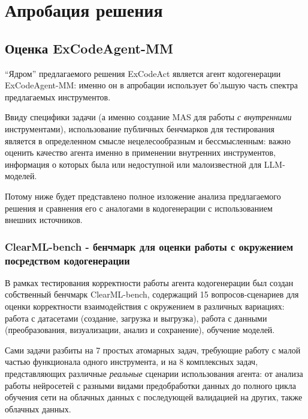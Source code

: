 \chapter{Апробация решения} \label{ch4}

\section{Оценка ExCodeAgent-MM} \label{ch4:sec1}

``Ядром'' предлагаемого решения ExCodeAct является агент кодогенерации ExCodeAgent-MM:
именно он в апробации использует бо'льшую часть спектра предлагаемых инструментов. 

Ввиду специфики задачи (а именно создание MAS для работы \textit{с внутренними} 
инструментами), использование публичных бенчмарков для тестирования является в определенном
смысле нецелесообразным и бессмысленным: важно оценить качество агента именно в применении внутренних
инструментов, информация о которых была или недоступной или малоизвестной для LLM-моделей.

Потому ниже будет представлено полное изложение анализа предлагаемого решения и сравнения
его с аналогами в кодогенерации с использованием внешних источников.

\subsection{ClearML-bench - бенчмарк для оценки работы с окружением посредством кодогенерации} \label{ch4:sec1:subsec1}

В рамках тестирования корректности работы агента кодогенерации был создан собственный  
бенчмарк ClearML-bench, содержащий 15 вопросов-сценариев для оценки корректности взаимодействия 
с окружением в различных вариациях: работа с датасетами (создание, загрузка и выгрузка), 
работа с данными (преобразования, визуализации, анализ и сохранение), обучение моделей.

Сами задачи разбиты на 7 простых атомарных задач, требующие работу с малой частью функционала одного
инструмента, и на 8 комплексных задач, представляющих различные \textit{реальные} сценарии использования
агента: от анализа работы нейросетей с разными видами предобработки данных до полного цикла
обучения сети на облачных данных с последующей валидацией на других, также облачных данных.

